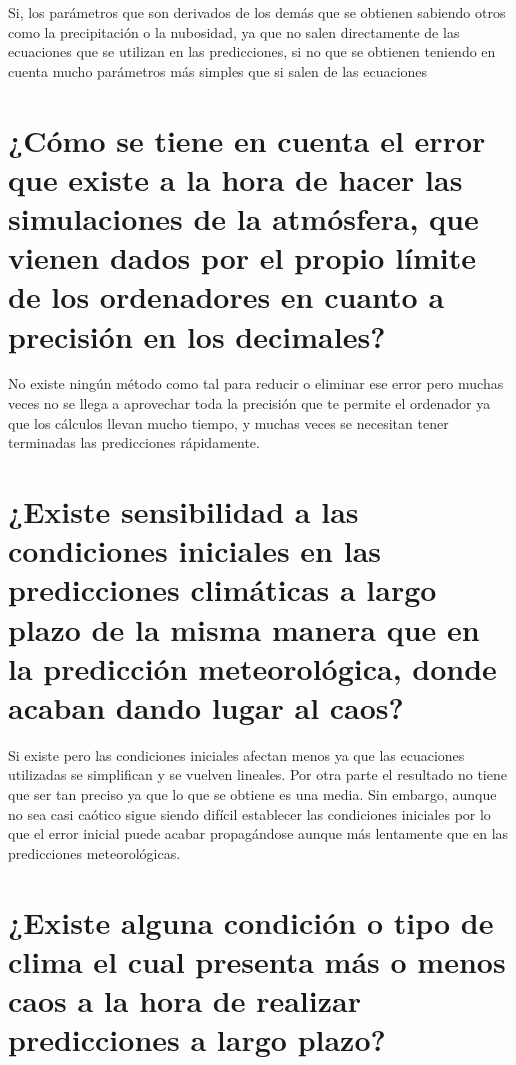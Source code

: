\documentclass[
  11pt,
  a4paper,
  DIV=11,
  numbers=noendperiod]{scrreprt}
\begin{document}
Si, los parámetros que son derivados de los demás que se obtienen
sabiendo otros como la precipitación o la nubosidad, ya que no salen
directamente de las ecuaciones que se utilizan en las predicciones, si
no que se obtienen teniendo en cuenta mucho parámetros más simples que
si salen de las ecuaciones

\section{¿Cómo se tiene en cuenta el error que existe a la hora de hacer
las simulaciones de la atmósfera, que vienen dados por el propio límite
de los ordenadores en cuanto a precisión en los
decimales?}\label{cuxf3mo-se-tiene-en-cuenta-el-error-que-existe-a-la-hora-de-hacer-las-simulaciones-de-la-atmuxf3sfera-que-vienen-dados-por-el-propio-luxedmite-de-los-ordenadores-en-cuanto-a-precisiuxf3n-en-los-decimales}

No existe ningún método como tal para reducir o eliminar ese error pero
muchas veces no se llega a aprovechar toda la precisión que te permite
el ordenador ya que los cálculos llevan mucho tiempo, y muchas veces se
necesitan tener terminadas las predicciones rápidamente.

\section{¿Existe sensibilidad a las condiciones iniciales en las
predicciones climáticas a largo plazo de la misma manera que en la
predicción meteorológica, donde acaban dando lugar al
caos?}\label{existe-sensibilidad-a-las-condiciones-iniciales-en-las-predicciones-climuxe1ticas-a-largo-plazo-de-la-misma-manera-que-en-la-predicciuxf3n-meteoroluxf3gica-donde-acaban-dando-lugar-al-caos}

Si existe pero las condiciones iniciales afectan menos ya que las
ecuaciones utilizadas se simplifican y se vuelven lineales. Por otra
parte el resultado no tiene que ser tan preciso ya que lo que se obtiene
es una media. Sin embargo, aunque no sea casi caótico sigue siendo
difícil establecer las condiciones iniciales por lo que el error inicial
puede acabar propagándose aunque más lentamente que en las predicciones
meteorológicas.

\section{¿Existe alguna condición o tipo de clima el cual presenta más o
menos caos a la hora de realizar predicciones a largo
plazo?}\label{existe-alguna-condiciuxf3n-o-tipo-de-clima-el-cual-presenta-muxe1s-o-menos-caos-a-la-hora-de-realizar-predicciones-a-largo-plazo}
\end{document}
